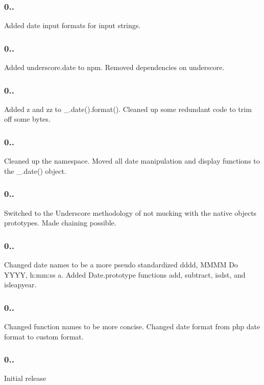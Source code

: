 \subsubsection*{0..}

Added date input formats for input strings.

\subsubsection*{0..}

Added underscore.\+date to npm. Removed dependencies on underscore.

\subsubsection*{0..}

Added {\ttfamily \textquotesingle{}z\textquotesingle{}} and {\ttfamily \textquotesingle{}zz\textquotesingle{}} to {\ttfamily \+\_\+.\+date().format()}. Cleaned up some redundant code to trim off some bytes.

\subsubsection*{0..}

Cleaned up the namespace. Moved all date manipulation and display functions to the \+\_\+.\+date() object.

\subsubsection*{0..}

Switched to the Underscore methodology of not mucking with the native objects\textquotesingle{} prototypes. Made chaining possible.

\subsubsection*{0..}

Changed date names to be a more pseudo standardized \textquotesingle{}dddd, M\+M\+MM Do Y\+Y\+YY, h\+:mm\+:ss a\textquotesingle{}. Added {\ttfamily Date.\+prototype} functions {\ttfamily add}, {\ttfamily subtract}, {\ttfamily isdst}, and {\ttfamily isleapyear}.

\subsubsection*{0..}

Changed function names to be more concise. Changed date format from php date format to custom format.

\subsubsection*{0..}

Initial release 